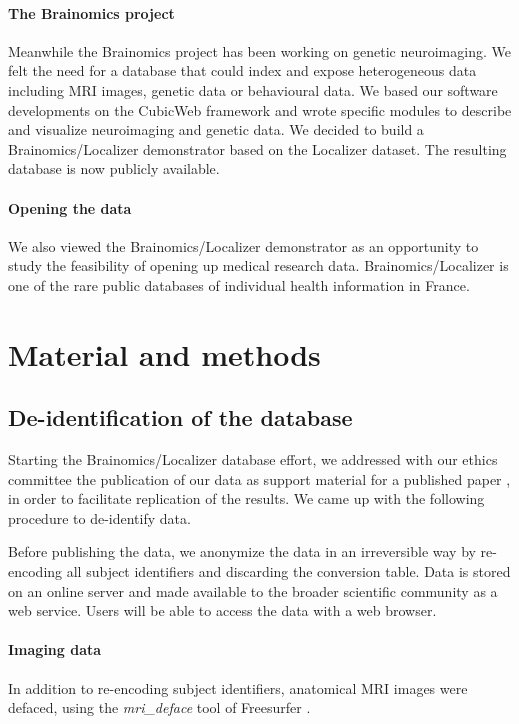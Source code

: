 \documentclass[review]{elsarticle}
\begin{document}
\paragraph{The Brainomics project} Meanwhile the Brainomics project has been working on genetic neuroimaging. We felt the need for a database that could index and expose heterogeneous data including MRI images, genetic data or behavioural data. We based our software developments on the CubicWeb framework and wrote specific modules to describe and visualize neuroimaging and genetic data. We decided to build a Brainomics/Localizer demonstrator based on the Localizer dataset. The resulting database is now publicly available.

\paragraph{Opening the data} We also viewed the Brainomics/Localizer demonstrator as an opportunity to study the feasibility of opening up medical research data. Brainomics/Localizer is one of the rare public databases of individual health information in France.


\section{Material and methods}

\subsection{De-identification of the database}

Starting the Brainomics/Localizer database effort, we addressed with our ethics committee the publication of our data as support material for a published paper \cite{Pinel2012}, in order to facilitate replication of the results. We came up with the following procedure to de-identify data.

Before publishing the data, we anonymize the data in an irreversible way by re-encoding all subject identifiers and discarding the conversion table. Data is stored on an online server and made available to the broader scientific community as a web service. Users will be able to access the data with a web
browser.

\paragraph{Imaging data} In addition to re-encoding subject identifiers, anatomical MRI images were defaced, using the \textit{mri\_deface} tool of Freesurfer \cite{Fischl2012}.
\end{document}
